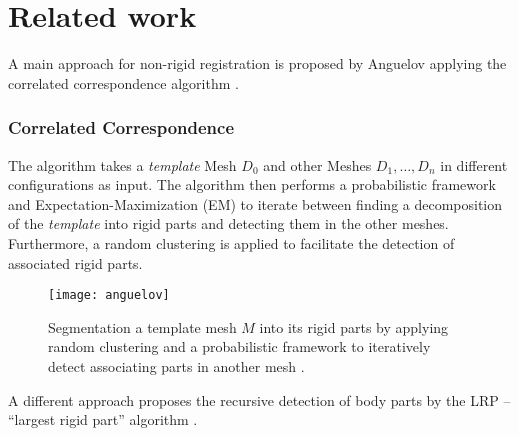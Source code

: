 \chapter{Related work}
\label{cha:RelatedWork}

A main approach for non-rigid registration is proposed by Anguelov \cite{Anguelov04} applying the correlated correspondence algorithm \cite{CorrelatedCorrespondance}. 
\subsection{Correlated Correspondence}
The algorithm takes a \textit{template} Mesh $D_0$ and other Meshes $D_1,\ldots,D_n$ in different configurations as input. The algorithm then performs a probabilistic framework and Expectation-Maximization (EM) to iterate between finding a decomposition of the \textit{template} into rigid parts and detecting them in the other meshes. Furthermore, a random clustering is applied to facilitate the detection of associated rigid parts.
\begin{figure}
	\centering
	\texttt{[image: anguelov]}
	\caption{Segmentation a template mesh $M$ into its rigid parts by applying random clustering and a probabilistic framework to iteratively detect associating parts in another mesh \cite{Anguelov04}.}
	\label{fig:correlatedcorrespondance}
\end{figure}
A different approach proposes the recursive detection of body parts by the LRP -- ``largest rigid part'' algorithm \cite {guo2016correspondence}. 
